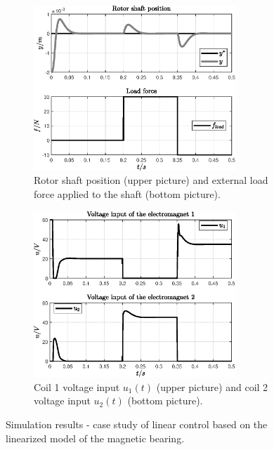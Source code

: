 \documentclass[11pt,a4paper,oneside]{book}
\numberwithin{equation}{section}
\theoremstyle{it}
\theoremstyle{definition}
\begin{document}
\begin{figure}[H]
	\centering
	\begin{subfigure}{0.5\textwidth}
		\centering
		\includegraphics[width = 215pt, angle = 0, 
		keepaspectratio]{figures/magnetic_bearing/sim_results/magnetic_bearing_fig1.eps}
		\captionsetup{width=0.65\textwidth, font=footnotesize}	
		\caption{Rotor shaft position (upper picture) and external load force applied to the shaft (bottom picture).}
		\label{}
	\end{subfigure}%
	\begin{subfigure}{0.5\textwidth}
		\centering
		\includegraphics[width = 215pt, angle = 0, 
		keepaspectratio]{figures/magnetic_bearing/sim_results/magnetic_bearing_fig2.eps}
		\captionsetup{width=0.65\textwidth, font=footnotesize}	
		\caption{Coil 1 voltage input $u_1(t)$ (upper picture) and coil 2 voltage input $u_2(t)$ (bottom picture).}
		\label{}
	\end{subfigure}
	\captionsetup{width=0.5\textwidth, font=small}	
	\caption{Simulation results - case study of linear control based on the linearized model of the magnetic bearing.}
	\label{}
\end{figure}
\end{document}
